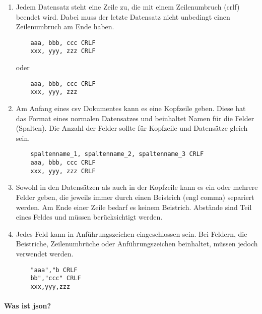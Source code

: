 \begin{enumerate}{}
	
	\item Jedem Datensatz steht eine Zeile zu, die mit einem Zeilenumbruch (\ac{crlf}) beendet wird. Dabei muss der letzte Datensatz nicht unbedingt einen Zeilenumbruch am Ende haben. \zB 
	\begin{lstlisting}
	aaa, bbb, ccc CRLF
	xxx, yyy, zzz CRLF
	\end{lstlisting}
	oder
	\begin{lstlisting}
	aaa, bbb, ccc CRLF
	xxx, yyy, zzz
	\end{lstlisting}
	
	\item Am Anfang eines \acs{csv} Dokumentes kann es eine Kopfzeile geben. Diese hat das Format eines normalen Datensatzes und beinhaltet Namen für die Felder (Spalten). Die Anzahl der Felder sollte für Kopfzeile und Datensätze gleich sein. \zB
	\begin{lstlisting}
	spaltenname_1, spaltenname_2, spaltenname_3 CRLF
	aaa, bbb, ccc CRLF
	xxx, yyy, zzz CRLF
	\end{lstlisting}
	
	\item Sowohl in den Datensätzen als auch in der Kopfzeile kann es ein oder mehrere Felder geben, die jeweils immer durch einen Beistrich (\acs{engl} comma) separiert werden. Am Ende einer Zeile bedarf es keinem Beistrich. Abstände sind Teil eines Feldes und müssen berücksichtigt werden.
	
	\item Jedes Feld kann in Anführungszeichen eingeschlossen sein. Bei Feldern, die Beistriche, Zeilenumbrüche oder Anführungszeichen beinhaltet, müssen jedoch verwendet werden. \zB
	\begin{lstlisting}
	"aaa","b CRLF
	bb","ccc" CRLF
	xxx,yyy,zzz
	\end{lstlisting}
	
\end{enumerate}

\paragraph{Was ist \acs{json}?}



